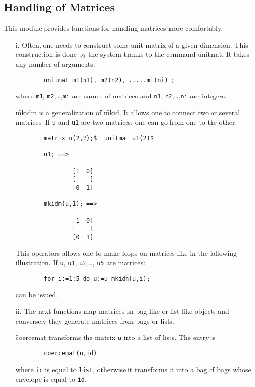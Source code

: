 \subsection{Handling of Matrices}
This module provides functions for handling matrices more comfortably.
\begin{itemize}
\item[i.]
\hypertarget{command:UNITMAT}{}
Often, one needs to construct{} some unit matrix of
a given dimension. This construction is done by the system thanks
to the command \f{unitmat}. It takes any number of arguments:
\begin{verbatim}
        unitmat m1(n1), m2(n2), .....mi(ni) ;
\end{verbatim}
where \texttt{m1}, \texttt{m2},\ldots,\texttt{mi} are names of matrices and
\texttt{n1}, \texttt{n2},\ldots,\texttt{ni} are integers.

\hypertarget{operator:MKIDM}{}
\f{mkidm} is a generalization of \f{mkid}. It allows one to connect
two or several matrices. If \texttt{u} and \texttt{u1} are two matrices,
one can go from one to the other:
\begin{verbatim}
        matrix u(2,2);$  unitmat u1(2)$

        u1; ==>

                [1  0]
                [    ]
                [0  1]

        mkidm(u,1); ==>

                [1  0]
                [    ]
                [0  1]
\end{verbatim}
This operators allows one to make loops on matrices like in the following
illustration. If \texttt{u}, \texttt{u1}, \texttt{u2},\ldots, \texttt{u5} are matrices:
\begin{verbatim}
        for i:=1:5 do u:=u-mkidm(u,i);
\end{verbatim}
can be issued.
\item[ii.]
The next functions map matrices on bag-like or list-like objects
and conversely  they generate matrices from bags or lists.

\hypertarget{operator:COERCEMAT}{}
\f{coercemat} transforms the matrix \texttt{u} into a list of lists.
The entry is
\begin{verbatim}
        coercemat(u,id)
\end{verbatim}
where \texttt{id} is equal to \texttt{list}, otherwise it transforms it into
a bag of bags whose envelope is equal to \texttt{id}.


\end{itemize}
